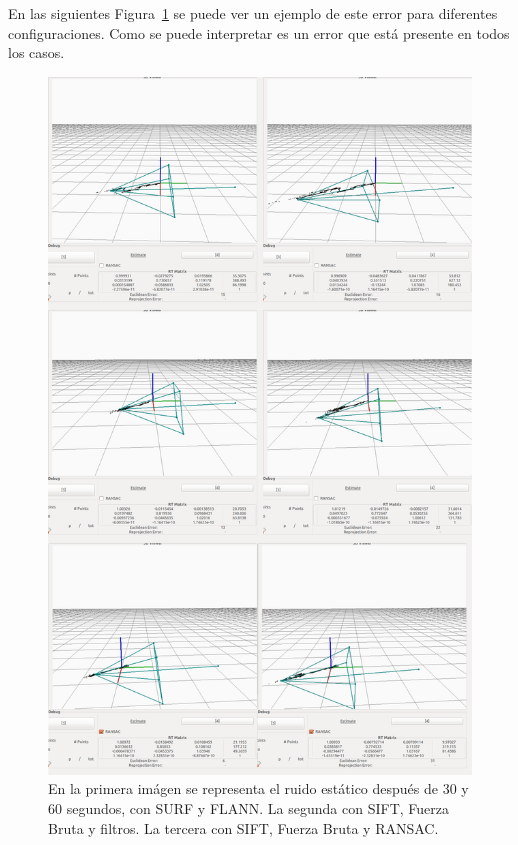 En las siguientes Figura~\ref{fig:static} se puede ver un ejemplo de este error para diferentes configuraciones. Como se puede interpretar es un error que está presente en todos los casos.

\begin{figure}[th]
\centering
\includegraphics[scale=0.3]{Figures/tests/static.png}
\decoRule
\caption[Capturas con ruido estático]{En la primera imágen se representa el ruido estático después de 30 y 60 segundos, con SURF y FLANN. La segunda con SIFT, Fuerza Bruta y filtros. La tercera con SIFT, Fuerza Bruta y RANSAC.}
\label{fig:static}
\end{figure}

